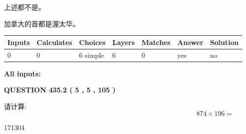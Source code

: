 \documentclass{ctexart}
\begin{document}
 
 上述都不是。
 
 
\noindent{}
 
 
加拿大的首都是渥太华。
 
 
\noindent{}
 
 
   
   
   
   
\noindent\begin{tabular}{|l|l|l|l|l|l|l|}
 \hline
Inputs & Calculates & Choices & Layers & Matches & Answer & Solution \\ \hline
 0  & 
 0  & 
 6
  simple  
  & 
 6  & 
 0  & 
  yes & 
  no 
  \\ \hline
 \end{tabular}
   
   
   
   
\noindent{}
   
   
   
   
\noindent\vspace{0.1in}\hspace{-0.08in} {\textbf{\Large{All inputs: }}}
   
   
  
\vspace{0.2in}
  
{\textbf{\Large{QUESTION
435.2 
 ( 5 , 5 , 105 )
}}}
  
  
 
请计算:
\begin{equation}
874  \times    %
196 = \nonumber
\end{equation}
 
 
 
\noindent{}
 
 

171304
 
 
\noindent{}
 
 

 
 
 
\noindent{}
 
\end{document}
